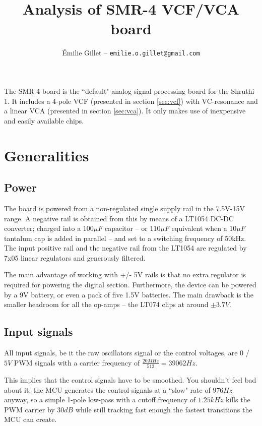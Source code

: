 \documentclass[a4paper,11pt]{article}
\title{Analysis of SMR-4 VCF/VCA board}
\author{Émilie Gillet -- \tt emilie.o.gillet@gmail.com}
\date{}
\begin{document}
\maketitle

The SMR-4 board is the ``default" analog signal processing board for the  Shruthi-1. It includes a 4-pole VCF (presented in section \ref{sec:vcf}) with VC-resonance and a linear VCA (presented in section \ref{sec:vca}). It only makes use of inexpensive and easily available chips.

\section{Generalities}

\subsection{Power}

The board is powered from a non-regulated single supply rail in the 7.5V-15V range. A negative rail is obtained from this by means of a LT1054 DC-DC converter; charged into a $100\mu F$ capacitor -- or $110\mu F$ equivalent when a $10\mu F$ tantalum cap is added in parallel -- and set to a switching frequency of 50kHz. The input positive rail and the negative rail from the LT1054 are regulated by 7x05 linear regulators and generously filtered.

The main advantage of working with +/- 5V rails is that no extra regulator is required for powering the digital section. Furthermore, the device can be powered by a 9V battery, or even a pack of five 1.5V batteries. The main drawback is the smaller headroom for all the op-amps -- the LT074 clips at around $\pm 3.7V$.

\subsection{Input signals}

All input signals, be it the raw oscillators signal or the control voltages, are $0$ / $5V$ PWM signals with a carrier frequency of $\frac{20MHz}{512} = 39062 Hz$.

This implies that the control signals have to be smoothed. You shouldn't feel bad about it: the MCU generates the control signals at a ``slow" rate of $976 Hz$ anyway, so a simple 1-pole low-pass with a cutoff frequency of $1.25 kHz$ kills the PWM carrier by $30dB$ while still tracking fast enough the fastest transitions the MCU can create.
\end{document}
